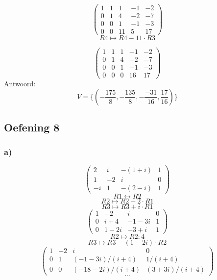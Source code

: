 \documentclass[lineaire_algebra_oplossingen.tex]{subfiles}
\begin{document}
\[
\begin{pmatrix}
1 & 1 & 1 & -1 & -2\\
0 & 1 & 4 & -2 & -7\\
0 & 0 & 1 & -1 & -3\\
0 & 0 & 11 & 5 & 17
\end{pmatrix}
\]
\[ R4 \longmapsto R4 - 11\cdot R3\]

\[
\begin{pmatrix}
1 & 1 & 1 & -1 & -2\\
0 & 1 & 4 & -2 & -7\\
0 & 0 & 1 & -1 & -3\\
0 & 0 & 0 & 16 & 17
\end{pmatrix}
\]
Antwoord:
\[
V = \{(-\frac{175}{8},-\frac{135}{8}, -\frac{-31}{16}, \frac{17}{16})\}
\]
\subsection{Oefening 8}
\subsubsection*{a)}
\[
\begin{pmatrix}
2 &  i &  -(1+i) & 1 \\
1 &  -2 &  i & 0 \\
-i &  1 &  -(2-i) & 1
\end{pmatrix}
\]
\[ R1 \leftrightarrow R2\]
\[ R2 \longmapsto R2 -2\cdot R1\]
\[ R3 \longmapsto R3 +i\cdot R1\]
\[
\begin{pmatrix}
1 &  -2 &  i & 0 \\
0 &  i+4 &  -1-3i & 1 \\
0 &  1-2i &  -3+i & 1
\end{pmatrix}
\]
\[ R2 \longmapsto R2 : 4\]
\[ R3 \longmapsto R3 -(1-2i)\cdot R2\]
\[
\begin{pmatrix}
1 &  -2 &  i & 0 \\
0 &  1 &  (-1-3i)/(i+4) & 1/(i+4) \\
0 &  0 &  (-18-2i)/(i+4) & (3+3i)/(i+4)
\end{pmatrix}
\]
\[...\]
\end{document}

